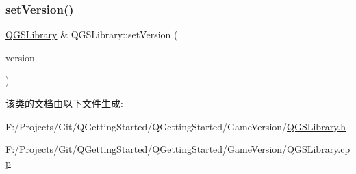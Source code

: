 \subsubsection{\texorpdfstring{set\+Version()}{setVersion()}}
{\footnotesize\ttfamily \mbox{\hyperlink{class_q_g_s_library}{Q\+G\+S\+Library}} \& Q\+G\+S\+Library\+::set\+Version (\begin{DoxyParamCaption}\item[{const Q\+String \&}]{version }\end{DoxyParamCaption})}



该类的文档由以下文件生成\+:\begin{DoxyCompactItemize}
\item 
F\+:/\+Projects/\+Git/\+Q\+Getting\+Started/\+Q\+Getting\+Started/\+Game\+Version/\mbox{\hyperlink{_q_g_s_library_8h}{Q\+G\+S\+Library.\+h}}\item 
F\+:/\+Projects/\+Git/\+Q\+Getting\+Started/\+Q\+Getting\+Started/\+Game\+Version/\mbox{\hyperlink{_q_g_s_library_8cpp}{Q\+G\+S\+Library.\+cpp}}\end{DoxyCompactItemize}
